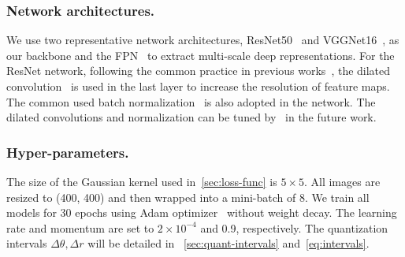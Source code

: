 \documentclass[10pt,journal,cspaper,compsoc]{IEEEtran}
\begin{document}
\subsubsection{Network architectures.}
We use two representative network architectures,
ResNet50~\cite{he2016deep} and VGGNet16~\cite{simonyan2014very}, as our backbone
and the FPN~\cite{lin2017feature} to extract multi-scale deep representations.
%
For the ResNet network, following the common practice in previous works~\cite{zhao2017pyramid,chen2018encoder,pami20Res2net},
the dilated convolution~\cite{yu2015multi} is used in the last layer to increase the resolution of feature maps. The common used batch normalization~\cite{ioffe2015batch} is also adopted in the network. 
The dilated convolutions and normalization can be tuned by~\cite{gao2021rbn,gao2021global2local} in the future work.


\subsubsection{Hyper-parameters.}
The size of the Gaussian kernel used in~\cref{sec:loss-func} is $5\times5$. 
%
All images are resized to (400, 400) and then wrapped into a mini-batch of 8.
%
We train all models for 30 epochs using Adam optimizer~\cite{kingma2014adam} without weight decay.
%
The learning rate and momentum are set to $2 \times 10^{-4}$ and 0.9, respectively.
%
The quantization intervals $\Delta\theta, \Delta r$ will be detailed in
~\cref{sec:quant-intervals} and~\cref{eq:intervals}.

\end{document}
